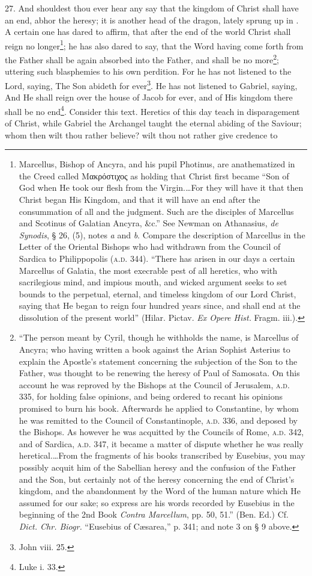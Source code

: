27. And shouldest thou ever hear any say that the kingdom of Christ shall have an end, abhor the heresy; it is another head of the dragon, lately sprung up in . A certain one has dared to affirm, that after the end of the world Christ shall reign no longer\footnote{Marcellus, Bishop of Ancyra, and his pupil Photinus, are anathematized in the Creed called \textgreek{Μακρόστιχος} as holding that Christ first became “Son of God when He took our flesh from the Virgin.…For they will have it that then Christ began His Kingdom, and that it will have an end after the consummation of all and the judgment. Such are the disciples of Marcellus and Scotinus of Galatian Ancyra, \&c.” See Newman on Athanasius, \emph{de Synodis}, § 26, (5), notes \emph{a} and \emph{b}. Compare the description of Marcellus in the Letter of the Oriental Bishops who had withdrawn from the Council of Sardica to Philippopolis (\textsc{a.d.} 344). “There has arisen in our days a certain Marcellus of Galatia, the most execrable pest of all heretics, who with sacrilegious mind, and impious mouth, and wicked argument seeks to set bounds to the perpetual, eternal, and timeless kingdom of our Lord Christ, saying that He began to reign four hundred years since, and shall end at the dissolution of the present world” (Hilar. Pictav. \emph{Ex Opere Hist.} Fragm. iii.).}; he has also dared to say, that the Word having come forth from the Father shall be again absorbed into the Father, and shall be no more\footnote{“The person meant by Cyril, though he withholds the name, is Marcellus of Ancyra; who having written a book against the Arian Sophist Asterius to explain the Apostle’s statement concerning the subjection of the Son to the Father, was thought to be renewing the heresy of Paul of Samosata. On this account he was reproved by the Bishops at the Council of Jerusalem, \textsc{a.d.} 335, for holding false opinions, and being ordered to recant his opinions promised to burn his book. Afterwards he applied to Constantine, by whom he was remitted to the Council of Constantinople, \textsc{a.d.} 336, and deposed by the Bishops. As however he was acquitted by the Councils of Rome, \textsc{a.d.} 342, and of Sardica, \textsc{a.d.} 347, it became a matter of dispute whether he was really heretical.…From the fragments of his books transcribed by Eusebius, you may possibly acquit him of the Sabellian heresy and the confusion of the Father and the Son, but certainly not of the heresy concerning the end of Christ’s kingdom, and the abandonment by the Word of the human nature which He assumed for our sake; so express are his words recorded by Eusebius in the beginning of the 2nd Book \emph{Contra Marcellum}, pp. 50, 51.” (Ben. Ed.) Cf. \emph{Dict. Chr. Biogr.} “Eusebius of Cæsarea,” p. 341; and note 3 on § 9 above.}; uttering such blasphemies to his own perdition. For he has not listened to the Lord, saying, The Son abideth for ever\footnote{John viii. 25.}. He has not listened to Gabriel, saying, And He shall reign over the house of Jacob for ever, and of His kingdom there shall be no end\footnote{Luke i. 33.}. Consider this text. Heretics of this day teach in disparagement of Christ, while Gabriel the Archangel taught the eternal abiding of the Saviour; whom then wilt thou rather believe? wilt thou not rather give credence to 